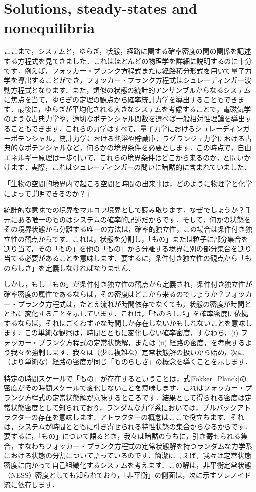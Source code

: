 \documentclass[a4paper, titlepage]{jsarticle}
\begin{document}
\section{Solutions, steady-states and nonequilibria}
ここまで，システムと，ゆらぎ，状態，経路に関する確率密度の間の関係を記述する方程式を見てきました．これはほとんどの物理学を詳細に説明するのに十分です．例えば，フォッカー・プランク方程式または経路積分形式を用いて量子力学を導出することができ，フォッカー・プランク方程式はシュレーディンガー波動方程式となります．また，類似の状態の統計的アンサンブルからなるシステムに焦点を当て，ゆらぎの定理の観点から確率統計力学を導出することもできます．最後に，ゆらぎが平均化される大きなシステムを考慮することで，電磁気学のような古典力学や，適切なポテンシャル関数を選べば一般相対性理論を導出することもできます．これらの力学はすべて，量子力学におけるシュレーディンガーポテンシャル，統計力学における熱浴や貯蔵庫，ラグランジュ力学における古典的なポテンシャルなど，何らかの境界条件を必要とします．この時点で，自由エネルギー原理は一歩引いて，これらの境界条件はどこから来るのか，と問いかけます．実際，これはシュレーディンガーの問いに暗黙的に含まれていました．
\par
「生物の空間的境界内で起こる空間と時間の出来事は，どのように物理学と化学によって説明できるのか？」
\par
統計的な意味での境界をマルコフ境界として読み取ります．なぜでしょうか？手元にある唯一のものはシステムの確率的記述だからです．そして，何かの状態をその境界状態から分離する唯一の方法は，確率的独立性，この場合は条件付き独立性の観点からです．これは，状態を分割し，「もの」または粒子に部分集合を割り当て，その「もの」を他の「もの」から分離する境界に別の部分集合を割り当てる必要があることを意味します．要するに，条件付き独立性の観点から「ものらしさ」を定義しなければなりません．
\par
しかし，もし「もの」が条件付き独立性の観点から定義され，条件付き独立性が確率密度の属性であるならば，その密度はどこから来るのでしょうか？フォッカー・プランク方程式は，たとえ流れが時間依存でなくても，状態の密度が時間とともに変化することを示しています．これは，「ものらしさ」を確率密度に依拠するならば，それはごくわずかな時間しか存在しないかもしれないことを意味します．この単純な観察は，時間とともに変化しない確率密度，すなわち，(i) フォッカー・プランク方程式の定常状態解，または (ii) 経路の密度，を考慮するよう我々を強制します．我々は（少し複雑な）定常状態解の扱いから始め，次に（より単純な）経路の密度が同じ「ものらしさ」の概念を導くことを示します．
\par
特定の時間スケールで「もの」が存在するということは，式\eqref{Fokker_Planck}の密度がその時間スケールで変化しないことを意味します．これはフォッカー・プランク方程式の定常状態解が意味するところです．結果として得られる密度は定常状態密度として知られており，ランダムな力学系においては，プルバックアトラクターの存在を意味します．アトラクターの概念はここで役立ちます．それは，システムが時間とともに引き寄せられる特性状態の集合からなるからです．要するに，「もの」について語るとき，我々は暗黙のうちに，引き寄せられる集合，すなわちフォッカー・プランク方程式の定常状態解を持つランダムな力学系における状態の分割について語っているのです．簡潔に言えば，我々は定常状態密度に向かって自己組織化するシステムを考えます．この解は，非平衡定常状態（NESS）密度としても知られており，「非平衡」の側面は，次に示すソレノイド流に依存します．
\end{document}
